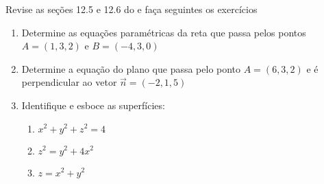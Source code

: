 \begin{frame}
	\begin{casa}
		Revise as seções 12.5 e 12.6 do \cite{Stewart} e faça seguintes os exercícios
		\begin{enumerate}
			\item Determine as equações paramétricas da reta que passa pelos pontos $A=(1,3,2)$ e $B=(-4,3,0)$
			
			\item Determine a equação do plano que passa pelo ponto $A=(6,3,2)$ e é perpendicular ao vetor $\vec{n}=(-2,1,5)$
				
		\item Identifique e esboce as superfícies:
		\begin{enumerate}[a]
			\item $x^2+y^2+z^2=4$
			\item $z^2=y^2+4x^2$
			\item $z=x^2+y^2$
		\end{enumerate}
		
		\end{enumerate}
	\end{casa}
\end{frame}